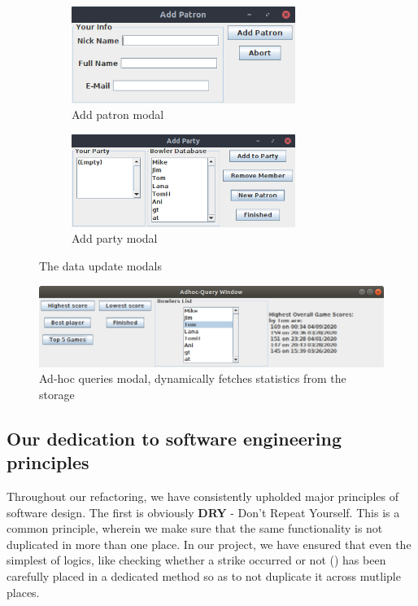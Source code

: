 \begin{figure}[H]
    \centering
    \begin{subfigure}{\textwidth}
        \centering
        \includegraphics[width = 0.8\textwidth]{img/addpatron.png}
        \caption{Add patron modal}
    \end{subfigure}
    \begin{subfigure}{\textwidth}
        \centering
        \includegraphics[width = 0.8\textwidth]{img/addparty.png}
        \caption{Add party modal}
    \end{subfigure}
    \caption{The data update modals}
\end{figure}

\begin{figure}[H]
    \centering
    \includegraphics[width = \textwidth]{img/queries.png}
    \caption{Ad-hoc queries modal, dynamically fetches statistics from the storage}
\end{figure}

\subsection{Our dedication to software engineering principles}

Throughout our refactoring, we have consistently upholded major principles of software design. The first is obviously \textbf{DRY} - Don't Repeat Yourself. This is a common principle, wherein we make sure that the same functionality is not duplicated in more than one place. In our project, we have ensured that even the simplest of logics, like checking whether a strike occurred or not () has been carefully placed in a dedicated method so as to not duplicate it across mutliple places.

